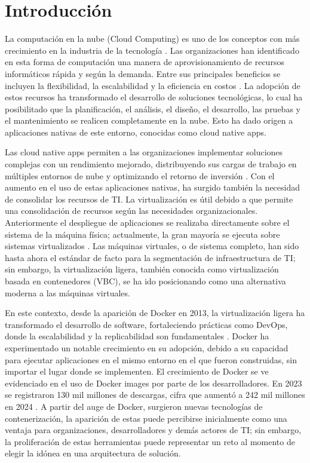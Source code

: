 \chapter{Introducción}
La computación en la nube (Cloud Computing) es uno de los conceptos con más crecimiento en la industria de la tecnología \cite{Jayaweera2024}. Las organizaciones han identificado en esta forma de computación una manera de aprovisionamiento de recursos informáticos rápida y según la demanda. Entre sus principales beneficios se incluyen la flexibilidad, la escalabilidad y la eficiencia en costos \cite{Ahmadi2024}. La adopción de estos recursos ha transformado el desarrollo de soluciones tecnológicas, lo cual ha posibilitado que la planificación, el análisis, el diseño, el desarrollo, las pruebas y el mantenimiento se realicen completamente en la nube. Esto ha dado origen a aplicaciones nativas de este entorno, conocidas como cloud native apps.

Las cloud native apps permiten a las organizaciones implementar soluciones complejas con un rendimiento mejorado, distribuyendo sus cargas de trabajo en múltiples entornos de nube y optimizando el retorno de inversión \cite{Alonso2023}. Con el aumento en el uso de estas aplicaciones nativas, ha surgido también la necesidad de consolidar los recursos de TI. La virtualización es útil debido a que permite una consolidación de recursos según las necesidades organizacionales. Anteriormente el despliegue de aplicaciones se realizaba directamente sobre el sistema de la máquina física; actualmente, la gran mayoría se ejecuta sobre sistemas virtualizados \cite{Jain2016}. Las máquinas virtuales, o de sistema completo, han sido hasta ahora el estándar de facto para la segmentación de infraestructura de TI; sin embargo, la virtualización ligera, también conocida como virtualización basada en contenedores (VBC), se ha ido posicionando como una alternativa moderna a las máquinas virtuales.

En este contexto, desde la aparición de Docker en 2013, la virtualización ligera ha transformado el desarrollo de software, fortaleciendo prácticas como DevOps, donde la escalabilidad y la replicabilidad son fundamentales \cite{Docker2021}. Docker ha experimentado un notable crecimiento en su adopción, debido a su capacidad para ejecutar aplicaciones en el mismo entorno en el que fueron construidas, sin importar el lugar donde se implementen. El crecimiento de Docker se ve evidenciado en el uso de Docker images por parte de los desarrolladores. En 2023 se registraron 130 mil millones de descargas, cifra que aumentó a 242 mil millones en 2024 \cite{Docker2024}. A partir del auge de Docker, surgieron nuevas tecnologías de contenerización, la aparición de estas puede percibirse inicialmente como una ventaja para organizaciones, desarrolladores y demás actores de TI; sin embargo, la proliferación de estas herramientas puede representar un reto al momento de elegir la idónea en una arquitectura de solución.


